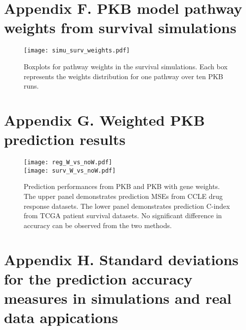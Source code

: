 \documentclass[a4paper,12pt]{article}
\begin{document}
\section*{Appendix F. PKB model pathway weights from survival simulations}
\label{sec:surv_weights}
\begin{figure}[htp]
	\centering
	\texttt{[image: simu\_surv\_weights.pdf]}
	\caption{Boxplots for pathway weights in the survival simulations. Each box represents the weights distribution for one pathway over ten PKB runs.}
\end{figure}
\newpage
\section*{Appendix G. Weighted PKB prediction results}
\label{sec:weightedPKB}

\begin{figure}[htp]
	\centering
	\texttt{[image: reg\_W\_vs\_noW.pdf]}\\ \vspace{-3mm}
	\texttt{[image: surv\_W\_vs\_noW.pdf]}
	\caption{Prediction performances from PKB and PKB with gene weights. The upper panel demonstrates prediction MSEs from CCLE drug response datasets. The lower panel demonstrates prediction C-index from TCGA patient survival datasets. No significant difference in accuracy can be observed from the two methods.}
\end{figure}
\newpage
\section*{Appendix H. Standard deviations for the prediction accuracy measures in simulations and real data appications}
\label{sec:std}
\end{document}
